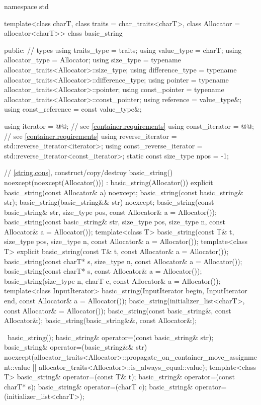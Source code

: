 \begin{codeblock}
namespace std {
  template<class charT, class traits = char_traits<charT>,
           class Allocator = allocator<charT>>
  class basic_string {
  public:
    // types
    using traits_type            = traits;
    using value_type             = charT;
    using allocator_type         = Allocator;
    using size_type              = typename allocator_traits<Allocator>::size_type;
    using difference_type        = typename allocator_traits<Allocator>::difference_type;
    using pointer                = typename allocator_traits<Allocator>::pointer;
    using const_pointer          = typename allocator_traits<Allocator>::const_pointer;
    using reference              = value_type&;
    using const_reference        = const value_type&;

    using iterator               = @@; // see \ref{container.requirements}
    using const_iterator         = @@; // see \ref{container.requirements}
    using reverse_iterator       = std::reverse_iterator<iterator>;
    using const_reverse_iterator = std::reverse_iterator<const_iterator>;
    static const size_type npos  = -1;

    // \ref{string.cons}, construct/copy/destroy
    basic_string() noexcept(noexcept(Allocator())) : basic_string(Allocator()) { }
    explicit basic_string(const Allocator& a) noexcept;
    basic_string(const basic_string& str);
    basic_string(basic_string&& str) noexcept;
    basic_string(const basic_string& str, size_type pos, const Allocator& a = Allocator());
    basic_string(const basic_string& str, size_type pos, size_type n,
                 const Allocator& a = Allocator());
    template<class T>
      basic_string(const T& t, size_type pos, size_type n, const Allocator& a = Allocator());
    template<class T>
      explicit basic_string(const T& t, const Allocator& a = Allocator());
    basic_string(const charT* s, size_type n, const Allocator& a = Allocator());
    basic_string(const charT* s, const Allocator& a = Allocator());
    basic_string(size_type n, charT c, const Allocator& a = Allocator());
    template<class InputIterator>
      basic_string(InputIterator begin, InputIterator end, const Allocator& a = Allocator());
    basic_string(initializer_list<charT>, const Allocator& = Allocator());
    basic_string(const basic_string&, const Allocator&);
    basic_string(basic_string&&, const Allocator&);

    ~basic_string();
    basic_string& operator=(const basic_string& str);
    basic_string& operator=(basic_string&& str)
      noexcept(allocator_traits<Allocator>::propagate_on_container_move_assignment::value ||
               allocator_traits<Allocator>::is_always_equal::value);
    template<class T>
      basic_string& operator=(const T& t);
    basic_string& operator=(const charT* s);
    basic_string& operator=(charT c);
    basic_string& operator=(initializer_list<charT>);

}}
\end{codeblock}
